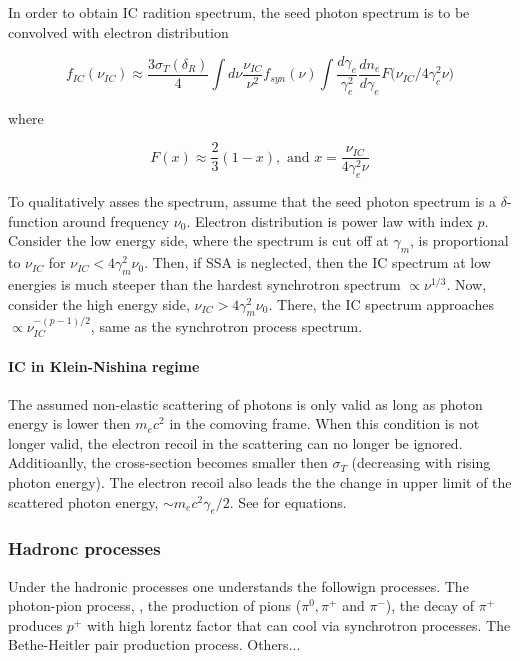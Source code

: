 In order to obtain IC radition spectrum, the seed photon spectrum is to be convolved with electron distribution \citep{RybickiLightman:1985}

\begin{equation}
f_{IC}(\nu_{IC}) \approx \frac{3\sigma_T (\delta_R)}{4} \int d\nu \frac{\nu_{IC}}{\nu^2}f_{syn}(\nu) \int \frac{d\gamma_e}{\gamma_e^2}\frac{dn_e}{d\gamma_e}F\big( \nu_{IC} / 4 \gamma_c^2\nu \big)
\end{equation}

where 

\begin{equation}
F(x) \approx \frac{2}{3}(1-x), \text{ and } x = \frac{\nu_{IC}}{4\gamma_e^2\nu}
\end{equation}

To qualitatively asses the spectrum, assume that the seed photon spectrum is a $\delta$-function around frequency $\nu_0$. Electron distribution is power law with index $p$.
Consider the low energy side, where the spectrum is cut off at $\gamma_m$, is proportional to $\nu_{IC}$ for $\nu_{IC} < 4\gamma_m^2\nu_0$. Then, if \ac{SSA} is neglected, then the \ac{IC} spectrum at low energies is much steeper than the hardest synchrotron spectrum $\propto\nu^{1/3}$.
Now, consider the high energy side, $\nu_{IC} > 4 \gamma_m^2\nu_0$. There, the \ac{IC} spectrum approaches $\propto \nu_{IC}^{-(p-1)/2}$, same as the synchrotron process spectrum.

\paragraph{IC in Klein-Nishina regime}

The assumed non-elastic scattering of photons is only valid as long as photon energy is lower then $m_e c^2$ in the comoving frame. When this condition is not longer valid, the electron recoil in the scattering can no longer be ignored. Additioanlly, the cross-section becomes smaller then $\sigma_T$ (decreasing with rising photon energy). 
The electron recoil also leads the the change in upper limit of the scattered photon energy, $\sim m_e c^2 \gamma_e / 2$. See \citet{RybickiLightman:1985} for equations.


\subsubsection{Hadronc processes}

Under the hadronic processes one understands the followign processes.
The photon-pion process, \ie, the production of pions ($\pi^0, \pi^+$ and $\pi^-$), the decay of $\pi^+$ produces $p^+$ with high lorentz factor that can cool via synchrotron processes.
The Bethe-Heitler pair production process.
Others...

